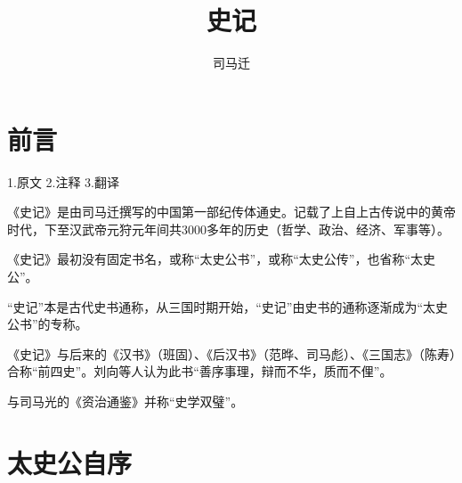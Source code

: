 \documentclass[12pt,UTF8]{ctexbook}
\title{\heiti\zihao{0} 史记}
\author{司马迁}
\date{}
\begin{document}
\maketitle
\tableofcontents

\frontmatter
\chapter{前言}

1.原文
2.注释
3.翻译

《史记》是由司马迁撰写的中国第一部纪传体通史。记载了上自上古传说中的黄帝时代，下至汉武帝元狩元年间共3000多年的历史（哲学、政治、经济、军事等）。

《史记》最初没有固定书名，或称“太史公书”，或称“太史公传”，也省称“太史公”。

“史记”本是古代史书通称，从三国时期开始，“史记”由史书的通称逐渐成为“太史公书”的专称。

《史记》与后来的《汉书》（班固）、《后汉书》（范晔、司马彪）、《三国志》（陈寿）合称“前四史”。刘向等人认为此书“善序事理，辩而不华，质而不俚”。

与司马光的《资治通鉴》并称“史学双璧”。

\chapter{太史公自序}
\end{document}
